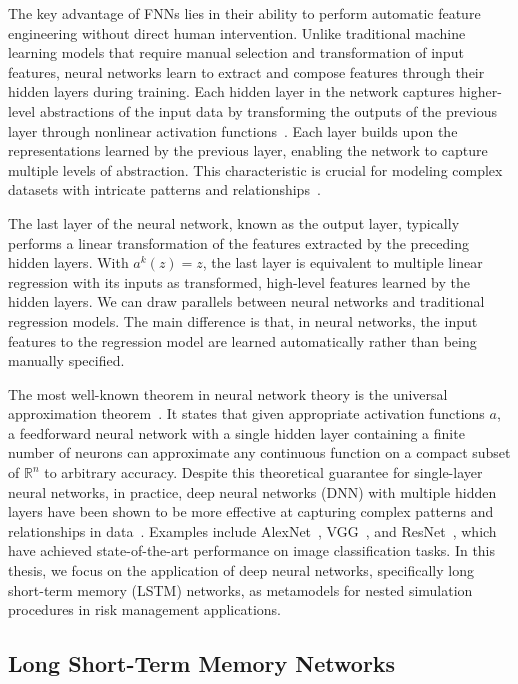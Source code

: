 The key advantage of FNNs lies in their ability to perform automatic feature engineering without direct human intervention. 
Unlike traditional machine learning models that require manual selection and transformation of input features, neural networks learn to extract and compose features through their hidden layers during training. 
Each hidden layer in the network captures higher-level abstractions of the input data by transforming the outputs of the previous layer through nonlinear activation functions~\citep{lecun2015deep}.
Each layer builds upon the representations learned by the previous layer, enabling the network to capture multiple levels of abstraction. 
This characteristic is crucial for modeling complex datasets with intricate patterns and relationships~\citep{bengio2013representation}.

The last layer of the neural network, known as the output layer, typically performs a linear transformation of the features extracted by the preceding hidden layers. 
With $a^{k}(z) = z$, the last layer is equivalent to multiple linear regression with its inputs as transformed, high-level features learned by the hidden layers.
We can draw parallels between neural networks and traditional regression models. 
The main difference is that, in neural networks, the input features to the regression model are learned automatically rather than being manually specified.

The most well-known theorem in neural network theory is the universal approximation theorem~\citep{hornik1989multilayer}.
It states that given appropriate activation functions $a$, a feedforward neural network with a single hidden layer containing a finite number of neurons can approximate any continuous function on a compact subset of $\mathbb{R}^n$ to arbitrary accuracy. 
Despite this theoretical guarantee for single-layer neural networks, in practice, deep neural networks (DNN) with multiple hidden layers have been shown to be more effective at capturing complex patterns and relationships in data~\citep{lecun2015deep}.
Examples include AlexNet~\citep{krizhevsky2012imagenet}, VGG~\citep{simonyan2014very}, and ResNet~\citep{he2016deep}, which have achieved state-of-the-art performance on image classification tasks.
In this thesis, we focus on the application of deep neural networks, specifically long short-term memory (LSTM) networks, as metamodels for nested simulation procedures in risk management applications.

\subsection{Long Short-Term Memory Networks} \label{subsec:LSTM}

